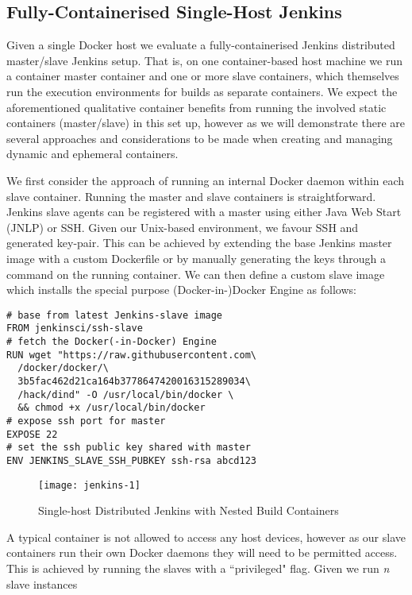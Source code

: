 \documentclass[journal]{IEEEtran}
\begin{document}
\subsection{Fully-Containerised Single-Host Jenkins}
Given a single Docker host we evaluate a fully-containerised Jenkins 
distributed master/slave Jenkins setup. That is, on one container-based
host machine we run a container master container and one or more slave containers,
which themselves run the execution environments for builds as separate containers. 
We expect the aforementioned qualitative container benefits from running the involved static 
containers (master/slave) in this set up, however as we will demonstrate 
there are several approaches and considerations to be made when creating and managing
dynamic and ephemeral containers.
\par
We first consider the approach of running an internal Docker daemon within
each slave container. Running the master and slave containers is straightforward. 
Jenkins slave agents can be registered with a master using either Java Web Start (JNLP) or SSH.
Given our Unix-based environment, we favour SSH and generated key-pair. This can be 
achieved by extending the base Jenkins master image with a custom Dockerfile or 
by manually generating the keys through a command on the running container. 
We can then define a custom slave image which installs the special purpose (Docker-in-)Docker 
Engine as follows:
\begin{verbatim}
# base from latest Jenkins-slave image
FROM jenkinsci/ssh-slave
# fetch the Docker(-in-Docker) Engine
RUN wget "https://raw.githubusercontent.com\
  /docker/docker/\
  3b5fac462d21ca164b3778647420016315289034\
  /hack/dind" -O /usr/local/bin/docker \
  && chmod +x /usr/local/bin/docker
# expose ssh port for master
EXPOSE 22
# set the ssh public key shared with master
ENV JENKINS_SLAVE_SSH_PUBKEY ssh-rsa abcd123
\end{verbatim}	
\begin{figure}[htp]
      \centering
      \texttt{[image: jenkins-1]}
      \caption{Single-host Distributed Jenkins with Nested Build Containers} 
      \label{fig:jenkins-1}
\end{figure}
\par
A typical container is not allowed to access any host devices,
however as our slave containers run their own Docker daemons they will need to be permitted access. 
This is achieved by running the slaves with a ``privileged" flag. Given we run \textit{n} slave instances
\end{document}
